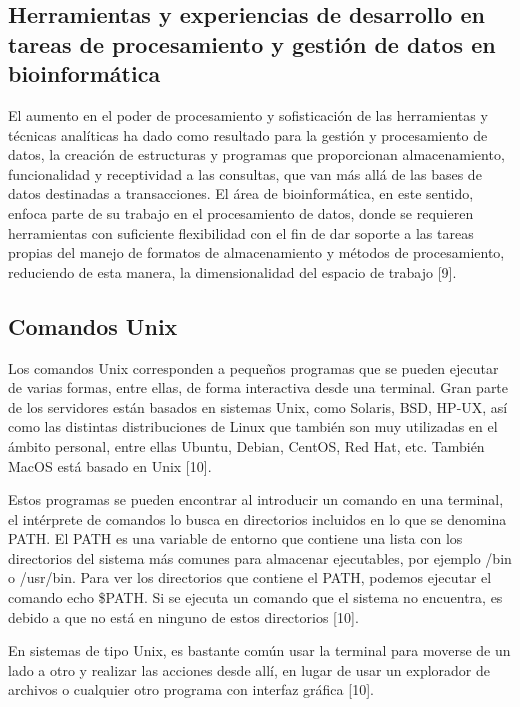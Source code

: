 \documentclass[12pt]{article}
\begin{document}
\subsection*{Herramientas y experiencias de desarrollo en tareas de procesamiento y gestión de datos en bioinformática}

El aumento en el poder de procesamiento y sofisticación de las herramientas y técnicas 
analíticas ha dado como resultado para la gestión y procesamiento de datos, la 
creación de estructuras y programas que proporcionan almacenamiento, funcionalidad y 
receptividad a las consultas, que van más allá de las bases de datos destinadas a 
transacciones. El área de bioinformática, en este sentido, enfoca parte de su trabajo 
en el procesamiento de datos, donde se requieren herramientas con suficiente flexibilidad 
con el fin de dar soporte a las tareas propias del manejo de formatos de almacenamiento y 
métodos de procesamiento, reduciendo de esta manera, la dimensionalidad del espacio de 
trabajo [9].

\subsection*{Comandos Unix}

Los comandos Unix corresponden a  pequeños programas que se pueden ejecutar de varias 
formas, entre ellas, de forma interactiva desde una terminal. Gran parte de los servidores 
están basados en sistemas Unix, como Solaris, BSD, HP-UX, así como las distintas 
distribuciones de Linux que también son muy utilizadas en el ámbito personal, entre 
ellas Ubuntu, Debian, CentOS, Red Hat, etc. También MacOS está basado en Unix [10].

Estos programas se pueden encontrar  al introducir un comando en una terminal, el 
intérprete de comandos lo busca en directorios incluidos en lo que se denomina PATH. El PATH 
es una variable de entorno que contiene una lista con los directorios del sistema 
más comunes para almacenar ejecutables, por ejemplo /bin o /usr/bin. Para ver los 
directorios que contiene el PATH, podemos ejecutar el comando echo \$PATH. Si se 
ejecuta un comando que el sistema no encuentra, es debido a que no está en ninguno de 
estos directorios [10].

En sistemas de tipo Unix, es bastante común usar la terminal para moverse de un 
lado a otro y realizar las acciones desde allí, en lugar de usar un explorador de 
archivos o cualquier otro programa con interfaz gráfica [10]. 
\end{document}
